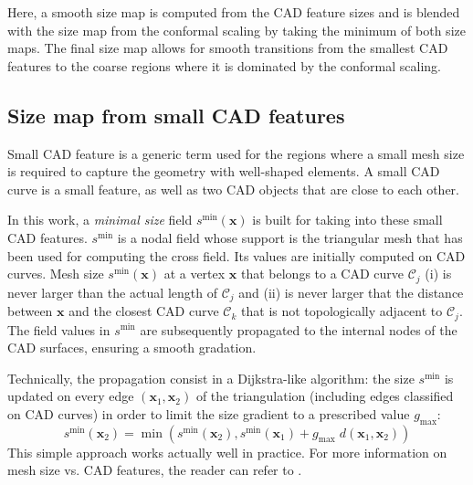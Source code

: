 \documentclass[AMA,STIX1COL]{WileyNJD-v2}
\newcommand{\vx}{\ensuremath{\mathbf{x}}}
\newcommand{\curve}{\ensuremath{\mathcal{C}}}
\begin{document}
{Here, a smooth size map is computed from the CAD
feature sizes and is blended with the size map from the conformal scaling
by taking the minimum of both size maps. The final size map
allows for smooth transitions from the smallest CAD features to the coarse
regions where it is dominated by the conformal scaling.

\subsection{Size map from small CAD features}
\label{ss:small}

Small CAD feature is a generic term used for the regions where
a small mesh size is required to capture the geometry with well-shaped
elements. A small CAD curve is a small feature, as well as two
CAD objects that are close to each other.

In this work, a \emph{minimal size} field $s^{\min}(\vx)$ is built
for taking into these small CAD features.
$s^{\min}$ is a nodal field whose support is the triangular mesh
that has been used for computing the cross field. Its values are
initially computed on CAD curves. Mesh size $s^{\min}(\vx)$ at a vertex $\vx$
that belongs to a CAD curve $\curve_j$ (i) is never larger than the
actual length of $\curve_j$ and (ii) is never larger that the distance
between $\vx$ and the closest  CAD curve $\curve_k$ that is
not topologically adjacent to $\curve_j$. The field values in $s^{\min}$ are
subsequently propagated to the internal nodes of the CAD surfaces,
ensuring a smooth gradation. 


Technically, the propagation consist in a Dijkstra-like algorithm:
the size $s^{\min}$ is updated on every edge $(\vx_1,\vx_2)$ of the
triangulation (including edges classified on CAD curves)
in order to limit the size gradient to a prescribed
value $g_{\max}$:
\begin{equation}
    s^{\min}(\vx_2) = \min(s^{\min}(\vx_2), s^{\min}(\vx_1) + g_{\max}\; d(\vx_1,\vx_2))
    \label{eq:one_way}
\end{equation}
This simple approach works actually well in practice. For more
information on mesh size vs. CAD features, the reader can refer to
\cite{bawin2020}.

}
\end{document}
